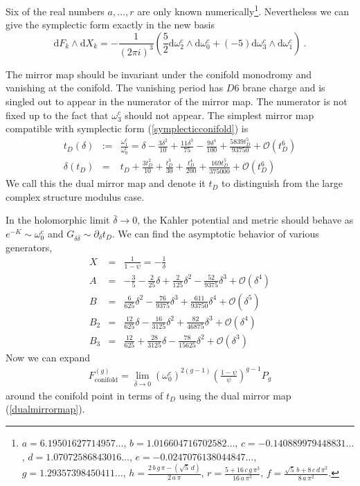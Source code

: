\documentclass[12pt]{article}
\def\dd{\mathrm{d}}
\begin{document}
Six of the real numbers
$a,\ldots,r$ are only known numerically\footnote{ 
$a= 6.19501627714957\ldots$,
$b= 1.016604716702582\ldots$, 
$c= -0.140889979448831\ldots$, 
$d=1.07072586843016\ldots$, 
$e= -0.0247076138044847\ldots$, 
$g= 1.29357398450411\ldots$, 
$h=\frac{ 2\,b\,g\,\pi -\left( {\sqrt{5}}\,d \right) }{2\,a\,\pi }$, 
$r=\frac{5 + 16\,c\,g\,{\pi }^3}{16\,a\,{\pi }^3}$,
$f=\frac{{\sqrt{5}}\,b + 8\,c\,d\,{\pi }^2}{8\,a\,{\pi }^2}$.}. 
Nevertheless we can give the symplectic form exactly in the new basis 
\begin{equation} 
\dd F_k\wedge \dd X_k = -\frac{1}{(2 \pi i)^3} \left(\frac{5}{2} \dd \omega_2^c\wedge\dd \omega_0^c +  
(-5)\dd \omega_3^c\wedge\dd \omega_1^c\right)\ .
\label{symplecticconifold} 
\end{equation} 


The mirror map should be invariant under the conifold monodromy
and vanishing at the conifold. The vanishing period has $D6$
brane charge and is singled out to appear in the numerator of the
mirror map. The numerator is not fixed up to the fact that 
$\omega_3^c$ should not appear. The simplest mirror map compatible with 
symplectic form (\ref{symplecticconifold}) is
\begin{eqnarray} \label{dualmirrormap}
t_D(\delta)&:=&\frac{\omega_1^c}{\omega_0^c}=\delta-\frac{3
\delta^2}{10}+\frac{11\delta^3}{75}-
\frac{9\delta^4}{100}+\frac{5839 t_D^5}{93750}
+\mathcal{O}(t_D^6)\\
\delta(t_D)&=&t_D+\frac{3 t_D^2}{10}+\frac{t_D^3}{30}+\frac{t_D^4}{200}+\frac{169 t_D^5}{375000}
+\mathcal{O}(t_D^6)
\end{eqnarray}
We call this the dual mirror map and denote it $t_D$ to
distinguish from the large complex structure modulus case.


In the holomorphic limit $\bar{\delta}\rightarrow 0$, the Kahler
potential and metric should behave as $e^{-K}\sim \omega_0^c$ and
$G_{\delta\bar{\delta}}\sim \partial_\delta t_D$. We can find the
asymptotic behavior of various generators,
\begin{eqnarray}
X&=& \frac{1}{1-\psi}=-\frac{1}{\delta}
\nonumber \\
A&=&
-\frac{3}{5}-\frac{2}{25}\delta+\frac{2}{125}\delta^2-\frac{52}{9375}\delta^3+\mathcal{O}(\delta^4)
\nonumber \\
B&=&
\frac{6}{625}\delta^2-\frac{76}{9375}\delta^3+\frac{611}{93750}\delta^4
+\mathcal{O}(\delta^5)
\nonumber \\
B_2 &=&
\frac{12}{625}\delta-\frac{16}{3125}\delta^2+\frac{82}{46875}\delta^3
+\mathcal{O}(\delta^4)
\nonumber \\
B_3 &=&
\frac{12}{625}+\frac{28}{3125}\delta-\frac{78}{15625}\delta^2
+\mathcal{O}(\delta^3) \label{leadingconifold.}
\end{eqnarray}
Now we can expand
\begin{eqnarray} \label{10-14-2.21}
F^{(g)}_{\textrm{conifold}}=\lim_{\bar{\delta}\rightarrow
0}(\omega_0^c)^{2(g-1)}(\frac{1-\psi}{\psi})^{g-1}P_g
\end{eqnarray}
around the conifold point in terms of $t_D$ using the dual mirror
map (\ref{dualmirrormap}). 
\end{document}
